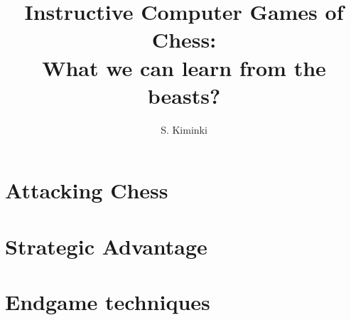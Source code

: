 \documentclass[a4paper,11pt,twocolumn]{report}
\title{Instructive Computer Games of Chess:\\What we can learn from the beasts?}
\author{S. Kiminki}
\begin{document}
\maketitle

\chapter{Attacking Chess}



\chapter{Strategic Advantage}



\chapter{Endgame techniques}




\end{document}
